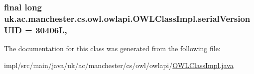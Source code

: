 \hypertarget{classuk_1_1ac_1_1manchester_1_1cs_1_1owl_1_1owlapi_1_1_o_w_l_class_impl_a01ea36a9cf2e782b1d5b058e43b73c7f}{
\subsubsection[{serial\-Version\-U\-I\-D}]{\setlength{\rightskip}{0pt plus 5cm}final long uk.\-ac.\-manchester.\-cs.\-owl.\-owlapi.\-O\-W\-L\-Class\-Impl.\-serial\-Version\-U\-I\-D = 30406\-L\hspace{0.3cm}{\ttfamily [static]}, {\ttfamily [private]}}}\label{classuk_1_1ac_1_1manchester_1_1cs_1_1owl_1_1owlapi_1_1_o_w_l_class_impl_a01ea36a9cf2e782b1d5b058e43b73c7f}


The documentation for this class was generated from the following file\-:\begin{DoxyCompactItemize}
\item 
impl/src/main/java/uk/ac/manchester/cs/owl/owlapi/\hyperlink{_o_w_l_class_impl_8java}{O\-W\-L\-Class\-Impl.\-java}\end{DoxyCompactItemize}
